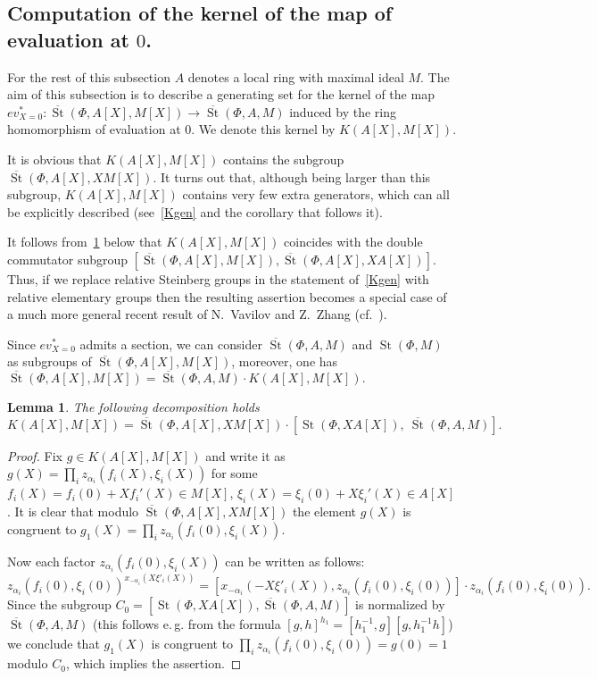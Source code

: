 \documentclass[oneside, 8pt]{amsart}
\newtheorem{lemma}{Lemma}
\theoremstyle{remark}
\theoremstyle{definition}
\numberwithin{lemma}{section}
\numberwithin{prop}{section}
\numberwithin{corollary}{section}
\numberwithin{externaltheorem}{section}
\DeclareMathOperator{\St}{St}
\numberwithin{equation}{section}
\begin{document}
\subsection{Computation of the kernel of the map of evaluation at \texorpdfstring{$0$}{0}.}
For the rest of this subsection $A$ denotes a local ring with maximal ideal $M$.
The aim of this subsection is to describe a generating set for the kernel of the map $ev_{X=0}^*\colon\overline{\St}(\Phi, A[X], M[X]) \to \overline{\St}(\Phi, A, M)$
induced by the ring homomorphism of evaluation at $0$. We denote this kernel by $K(A[X], M[X])$.

It is obvious that $K(A[X], M[X])$ contains the subgroup $\overline{\St}(\Phi, A[X], XM[X])$. It turns out that, although being larger than this subgroup, $K(A[X], M[X])$ contains very few extra generators, which can all be explicitly described (see~\cref{Kgen} and the corollary that follows it). 

It follows from~\cref{Kdecomp1} below that $K(A[X], M[X])$ coincides with the double commutator subgroup $[\overline{\St}(\Phi, A[X], M[X]), \overline{\St}(\Phi, A[X], XA[X])].$ Thus, if we replace relative Steinberg groups in the statement of~\cref{Kgen} with relative elementary groups then the resulting assertion becomes a special case of a much more general recent result of N.~Vavilov and Z.~Zhang (cf.~\cite[Theorem~1]{VZ18}).

Since $ev_{X=0}^*$ admits a section, we can consider $\overline{\St}(\Phi, A, M)$ and $\St(\Phi, M)$ as subgroups of $\overline{\St}(\Phi, A[X], M[X])$,
 moreover, one has $\overline{\St}(\Phi, A[X], M[X]) = \overline{\St}(\Phi, A, M) \cdot K(A[X], M[X]).$
\begin{lemma} \label{Kdecomp1} The following decomposition holds
 \[ K(A[X], M[X]) = \overline{\St}(\Phi, A[X], XM[X]) \cdot \left[\St(\Phi, XA[X]),\ \overline{\St}(\Phi, A, M)\right].\] \end{lemma}
\begin{proof} Fix $g \in K(A[X], M[X])$ and write it as $g(X) = \prod_i z_{\alpha_i}(f_i(X), \xi_i(X))$ for some $f_i(X) = f_i(0) + Xf_i'(X) \in M[X]$, $\xi_i(X) = \xi_i(0) + X\xi_i'(X) \in A[X]$.
 It is clear that modulo $\overline{\St}(\Phi, A[X], XM[X])$ the element $g(X)$ is congruent to $g_1(X) = \prod_i z_{\alpha_i}(f_i(0), \xi_i(X)).$ 
 
 Now each factor $z_{\alpha_i}(f_i(0), \xi_i(X))$ can be written as follows:
 \[z_{\alpha_i}(f_i(0), \xi_i(0))^{x_{-\alpha_i}(X\xi'_i(X))} = [x_{-\alpha_i}(-X\xi'_i(X)), z_{\alpha_i}(f_i(0), \xi_i(0))] \cdot z_{\alpha_i}(f_i(0), \xi_i(0)).\]
 Since the subgroup $C_0 = \left[\St(\Phi, XA[X]), \overline{\St}(\Phi, A, M)\right]$ is normalized by $\overline{\St}(\Phi, A, M)$ 
 (this follows e.\,g. from the formula $[g, h]^{h_1} = [h_1^{-1}, g][g, h_1^{-1}h]$) we conclude that $g_1(X)$ is congruent to $\prod_i z_{\alpha_i}(f_i(0), \xi_i(0)) = g(0) = 1$ modulo $C_0$,
 which implies the assertion. \qedhere \end{proof}
\end{document}
